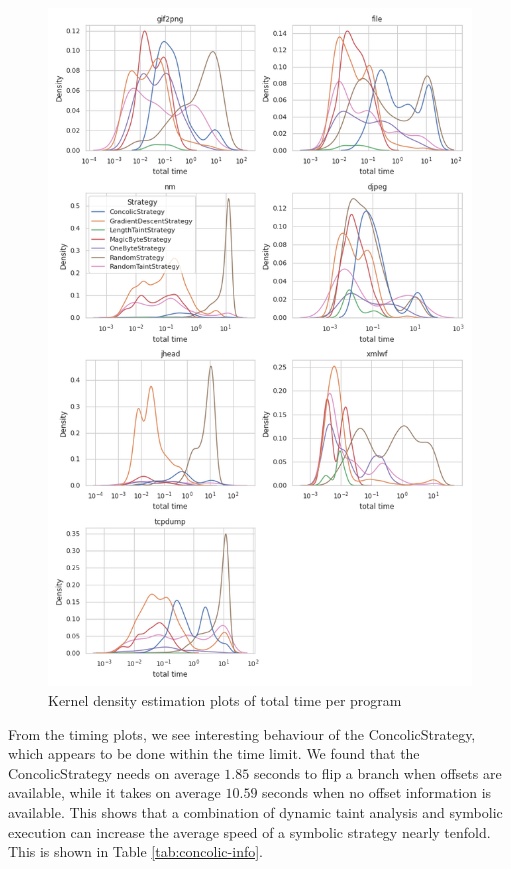 \begin{figure}[H]
    \centering
    \includegraphics[width=\textwidth,height=\textheight,keepaspectratio]{5_results/graphs_new/kde_flipped_timing.png}  
    \caption{Kernel density estimation plots of total time per program}
    \label{fig:kde-timing}
\end{figure}

From the timing plots, we see interesting behaviour of the ConcolicStrategy, which appears to be done within the time limit. We found that the ConcolicStrategy needs on average $1.85$ seconds to flip a branch when offsets are available, while it takes on average $10.59$ seconds when no offset information is available. This shows that a combination of dynamic taint analysis and symbolic execution can increase the average speed of a symbolic strategy nearly tenfold. This is shown in Table \ref{tab:concolic-info}.

